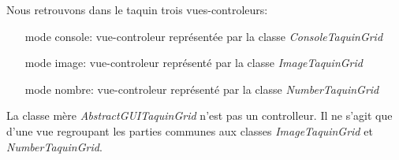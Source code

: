	Nous retrouvons dans le taquin trois vues-controleurs:


	\begin{itemize}
		\item [mode console:] vue-controleur représentée par la classe \textit{ConsoleTaquinGrid}
		\item [mode image:] vue-controleur représenté par la classe \textit{ImageTaquinGrid}
		\item [mode nombre:] vue-controleur représenté par la classe \textit{NumberTaquinGrid}
	\end{itemize}

	La classe mère \textit{AbstractGUITaquinGrid} n'est pas un controlleur. Il ne s'agit que d'une vue regroupant les parties communes aux classes \textit{ImageTaquinGrid} et \textit{NumberTaquinGrid}.
